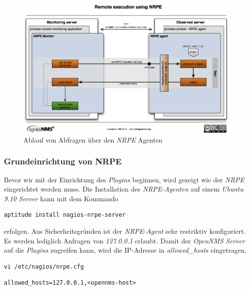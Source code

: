 \begin{figure}[H]
	\centering
	\includegraphics[width=1.0\textwidth]{images/use-cases/script-extending-linux/flow-nrpe}
	\caption{Ablauf von Abfragen über den \emph{NRPE} Agenten}
	\label{pic:flow-nrpe}
\end{figure}

\subsubsection{Grundeinrichtung von NRPE}
Bevor wir mit der Einrichtung des \emph{Plugins} beginnen, wird gezeigt wie der \emph{NRPE} eingerichtet werden muss. Die Installation des \emph{NRPE-Agenten} auf einem \emph{Ubuntu 9.10 Server} kann mit dem Kommando

\begin{lstlisting}[numbers=none]
aptitude install nagios-nrpe-server
\end{lstlisting}

erfolgen. Aus Sicherheitsgründen ist der \emph{NRPE-Agent} sehr restriktiv konfiguriert. Es werden lediglich Anfragen von \emph{127.0.0.1} erlaubt. Damit der \emph{OpenNMS Server} auf die \emph{Plugins} zugreifen kann, wird die IP-Adresse in \emph{allowed\_hosts} eingetragen.

\begin{lstlisting}[numbers=none]
vi /etc/nagios/nrpe.cfg
\end{lstlisting}

\begin{lstlisting}[numbers=none]
allowed_hosts=127.0.0.1,<opennms-host>
\end{lstlisting}

